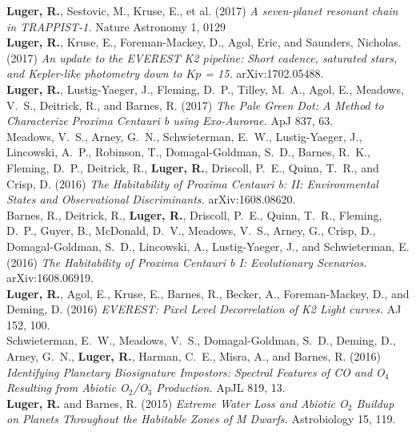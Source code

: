 \documentclass[11pt]{article}
\begin{document}
\textbf{Luger, R.}, Sestovic, M., Kruse, E., et al. (2017) \emph{A seven-planet resonant chain in TRAPPIST-1.} Nature Astronomy 1, 0129\\[-0.3cm]

\textbf{Luger, R.}, Kruse, E., Foreman-Mackey, D., Agol, Eric, and Saunders, Nicholas. (2017) \emph{An update to the EVEREST K2 pipeline: Short cadence, saturated stars, and Kepler-like photometry down to $Kp$ = 15.} arXiv:1702.05488.\\[-0.3cm]

\textbf{Luger, R.}, Lustig-Yaeger, J., Fleming, D.~P., Tilley, M.~A., Agol, E., Meadows, V.~S., Deitrick, R., and Barnes, R. (2017) \emph{The Pale Green Dot: A Method to Characterize Proxima Centauri b using Exo-Aurorae.} ApJ 837, 63.\\[-0.3cm]

Meadows, V.~S., Arney, G.~N., Schwieterman, E.~W., 
Lustig-Yaeger, J., Lincowski, A.~P., Robinson, T., 
Domagal-Goldman, S.~D., Barnes, R.~K., Fleming, D.~P., 
Deitrick, R., \textbf{Luger, R.}, Driscoll, P.~E., Quinn, T.~R., and
Crisp, D. (2016) \emph{The Habitability of Proxima Centauri b: II: Environmental States and Observational Discriminants.} arXiv:1608.08620.\\[-0.3cm]

Barnes, R., Deitrick, R., \textbf{Luger, R.}, Driscoll, P.~E., 
Quinn, T.~R., Fleming, D.~P., Guyer, B., McDonald, D.~V., 
Meadows, V.~S., Arney, G., Crisp, D., Domagal-Goldman, S.~D., 
Lincowski, A., Lustig-Yaeger, J., and Schwieterman, E. (2016)
\emph{The Habitability of Proxima Centauri b I: Evolutionary Scenarios.} arXiv:1608.06919.\\[-0.3cm]

\textbf{Luger, R.}, Agol, E., Kruse, E., Barnes, R., Becker, A., Foreman-Mackey, D., and Deming, D. (2016) \emph{EVEREST: Pixel Level Decorrelation of K2 Light curves.} AJ 152, 100.\\[-0.3cm]

Schwieterman, E.~W., Meadows, V.~S., Domagal-Goldman, S.~D., 
Deming, D., Arney, G.~N., \textbf{Luger, R.}, Harman, C.~E., 
Misra, A., and Barnes, R. (2016) \emph{Identifying Planetary Biosignature Impostors: Spectral Features of CO and O$_4$ Resulting from Abiotic O$_2$/O$_3$ Production.} ApJL 819, 13.\\[-0.3cm]

\textbf{Luger, R.} and Barnes, R. (2015) \emph{Extreme Water Loss and Abiotic O$_2$ Buildup on Planets Throughout the Habitable Zones of M Dwarfs.} Astrobiology 15, 119.\\[-0.3cm]
\end{document}
